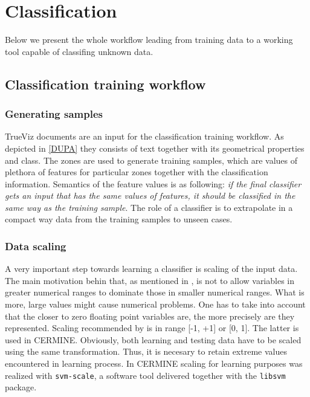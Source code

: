 \chapter{Classification}
Below we present the whole workflow leading from training data to a working tool capable of classifing unknown data.
\section{Classification training workflow}
\subsection{Generating samples}
TrueViz documents are an input for the classification training workflow. As depicted in \ref{DUPA} they consists of text together with its geometrical properties and class. The zones are used to generate training samples, which are values of plethora of features for particular zones together with the classification information. Semantics of the feature values is as following: \textit{if the final classifier gets an input that has the same values of features, it should be classified in the same way as the training sample}. The role of a classifier is to extrapolate in a compact way data from the training samples to unseen cases.
\subsection{Data scaling}
A very important step towards learning a classifier is scaling of the input data. The main motivation behin that, as mentioned in \cite{Chih-WeiHsu2010}, is not to allow variables in greater numerical ranges to dominate those in smaller numerical ranges. What is more, large values might cause numerical problems. One has to take into account that the closer to zero floating point variables are, the more precisely are they represented. Scaling recommended by \cite{Chih-WeiHsu2010} is in range [-1, +1] or  [0, 1]. The latter is used in CERMINE. Obviously, both learning and testing data have to be scaled using the same transformation. Thus, it is necesary to retain extreme values encountered in learning process.
In CERMINE scaling for learning purposes was realized with \verb+svm-scale+, a software tool delivered together with the \verb+libsvm+ package.
